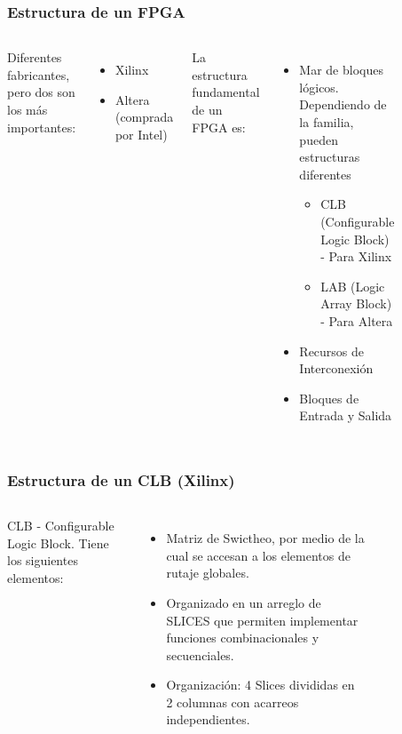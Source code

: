 \frame
{
  \frametitle{Estructura de un FPGA}
  \begin{columns}
  Diferentes fabricantes, pero dos son los m\'as importantes: %
\begin{itemize}
	\item Xilinx %
	\item Altera (comprada por Intel) %
\end{itemize}

La estructura fundamental de un FPGA es:  %
\begin{itemize}
	\item Mar de bloques l\'ogicos. Dependiendo de la familia, pueden estructuras diferentes	%
	\begin{itemize}
		\item CLB (Configurable Logic Block) - Para Xilinx  %
		\item LAB (Logic Array Block) - Para Altera %
	\end{itemize}
	\item Recursos de Interconexi\'on %
	\item Bloques de Entrada y Salida %
\end{itemize}
	   \begin{center}
			\begin{figure}      
		 \end{figure}	
		 \end{center}
		 \end{columns}
}

\frame
{
  \frametitle{Estructura de un CLB (Xilinx)}
 	\begin{columns}
  CLB - Configurable Logic Block. Tiene los siguientes elementos: %
		\begin{itemize}
			\item Matriz de Swictheo, por medio de la cual se accesan a los elementos de rutaje globales. %
			\item Organizado en un arreglo de SLICES que permiten implementar funciones combinacionales y secuenciales. %
			\item Organizaci\'on: 4 Slices divididas en 2 columnas con acarreos independientes. %
		\end{itemize}  
	   \begin{center}
			\begin{figure}      
		 \end{figure}	
		 \end{center}
  \end{columns}
 }
 
